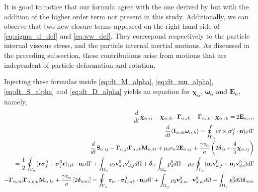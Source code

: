 It is good to notice that our formula agree with the one derived by \citet{lhuillier1987phenomenology} but with the addition of the higher order term not present in this study. 
Additionally, we can observe that two new closure terms appeared on the right-hand side of \ref{eq:sigma_d_def}  and \ref{eq:ww_def}. 
They correspond respectively to the particle internal viscous stress, and the particle internal inertial motions.
As discussed in the preceding subsection, these contributions arise from motions that are independent of particle deformation and rotation.



Injecting these formulas inside \ref{eq:dt_M_alpha}, \ref{eq:dt_mu_alpha}, \ref{eq:dt_S_alpha} and \ref{eq:dt_D_alpha}  yields an equation for $\bm\chi_\alpha$, $\bm\omega_\alpha$ and $\textbf{E}_\alpha$, namely,
\begin{align}
    \frac{d}{dt} \bm\chi_{\alpha,ij}
    -\bm\chi_{\alpha,ik} \cdot \bm\Gamma_{\alpha,jk}
    - \bm\Gamma_{\alpha,ik} \cdot \bm\chi_{\alpha,jk}
    =
    2\textbf{E}_{\alpha,ij},
    \label{eq:dt_M2}
    \\
    \frac{d}{dt} (\textbf{I}_{\alpha,ik}\bm\omega_{\alpha,k} )
    = 
    \oint_{\Gamma_{\alpha}} (\textbf{r}\times\bm\sigma_f^0\cdot \textbf{n})_i d\Gamma 
    \label{eq:dt_mu2}
    \\
    \frac{d}{dt} \textbf{S}_{\alpha,ij}
    -  \bm\Gamma_{\alpha,jl}\bm\Gamma_{\alpha,ik} \textbf{M}_{\alpha,kl}  
    + \mu_d v_\alpha 2\textbf{E}_{\alpha,ij}
    + \frac{\gamma v_\alpha }{a} \left(
    2\bm\delta_{ij} 
    + \frac{4 }{5} \bm\chi_{\alpha,ij}
    \right)\nonumber\\
    = 
    \frac{1}{2}\oint_{\Gamma_{\alpha}} (\textbf{r}\bm\sigma_f^0 + \bm\sigma_f^0\textbf{r})_{ijk}\cdot \textbf{n}_k d\Gamma 
    + \int_{\Omega_{\alpha}} \rho_2 \textbf{v}_{d,i}^0\textbf{v}_{d,j}^0 d\Omega
    + \bm\delta_{ij}\int_{\Omega_{\alpha}} p_d^0 d\Omega 
    - \mu_d \oint_{\Gamma_{\alpha}} (\textbf{n}_i \textbf{v}_{d,j}^0 + \textbf{n}_j \textbf{v}_{d,i}^0) d\Gamma
    \label{eq:dt_S2}
    \\
    \label{eq:dt_trM2}
    -  \bm\Gamma_{\alpha,ml}\bm\Gamma_{\alpha,mk} \textbf{M}_{\alpha,kl}  
    + \frac{\gamma v_\alpha }{a} 
    \left[
    2\bm\delta_{mm} 
    \right]
    = 
    \oint_{\Gamma_{\alpha}} \textbf{r}_m\cdot\bm\sigma_{1,mk}^0\cdot \textbf{n}_k d\Gamma 
    + \int_{\Omega_{\alpha}} \rho_2 \textbf{v}_{d,m}^0\cdot \textbf{v}_{d,m}^0 d\Omega
    + \int_{\Omega_{\alpha}} p_d^0 d\Omega \bm\delta_{mm}
\end{align}
